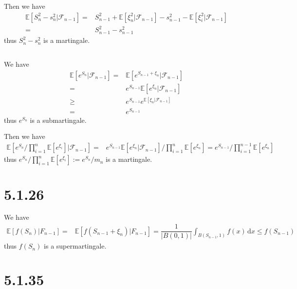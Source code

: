 \documentclass[11pt,a4paper]{ctexart}
\numberwithin{equation}{section}%
\newcommand{\F}{\mathcal{F}}
\begin{document}
Then we have
\begin{align*}
    \mathbb{E}\left[ S_n^2-s_n^2 | \F_{n-1} \right] =&   S_{n-1}^2 + \mathbb{E}\left[ \xi _n^2 | \F_{n-1} \right] - s_{n-1}^2 - \mathbb{E}\left[ \xi _i^2 | \F_{n-1} \right] \\
    =& S_{n-1}^2 - s_{n-1}^2 
\end{align*}
thus $ S_n^2-s_n^2 $ is a martingale.


\subsection{}

We have
\begin{align*}
    \mathbb{E}\left[ e^{S_n}| \F_{n-1} \right] =& \mathbb{E}\left[ e^{S_{n-1}+\xi _n} | \F_{n-1} \right] \\
    =& e^{S_{n-1}}\mathbb{E}\left[ e^{\xi _n} | \F_{n-1} \right] \\
    \geq & e^{S_{n-1}} e^{\mathbb{E}\left[ \xi _n | \F_{n-1} \right]} \\
    =& e^{S_{n-1}}
\end{align*}
thus $ e^{S_n} $ is a submartingale.

Then we have 
\begin{align*}
    \mathbb{E}\left[ e^{S_n}/\prod_{i=1}^n\mathbb{E}\left[ e^{\xi _i} \right] | \F_{n-1} \right] =&   e^{S_{n-1}}\mathbb{E}\left[ e^{\xi _n} | \F_{n-1} \right] /\prod_{i=1}^n\mathbb{E}\left[ e^{\xi _n} \right]=e^{S_{n-1}}/\prod_{i=1}^{n-1}\mathbb{E}\left[ e^{\xi _n} \right]
\end{align*}
thus $ e^{S_n}/\prod_{i=1}^n\mathbb{E}\left[ e^{\xi _i} \right] := e^{S_n}/m_n $ is a martingale.

\section{5.1.26}

We have
\begin{align*}
    \mathbb{E}\left[ f(S_n)|F_{n-1} \right] =& \mathbb{E}\left[ f(S_{n-1}+\xi _n)|F_{n-1} \right] 
    = \dfrac{ 1 }{ \left\vert B(0,1) \right\vert  } \int_{B(S_{n-1},1)} f(x)\,\mathrm{d}x 
    \leq f(S_{n-1})
\end{align*}
thus $ f(S_n) $ is a supermartingale.


\section{5.1.35}
\end{document}
